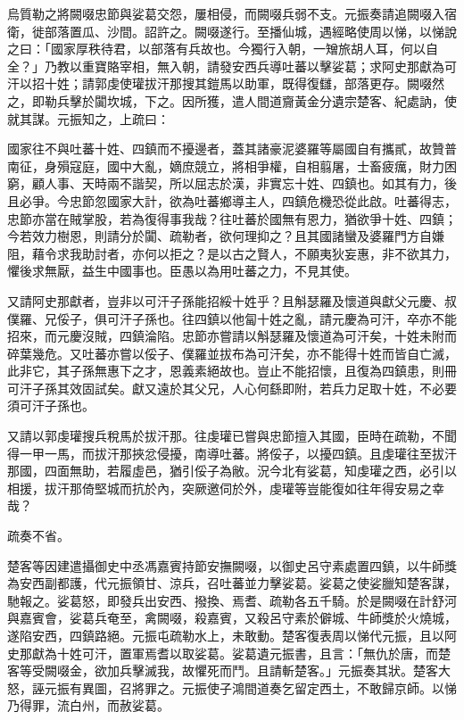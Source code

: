 \begin{pinyinscope}
 烏質勒之將闕啜忠節與娑葛交怨，屢相侵，而闕啜兵弱不支。元振奏請追闕啜入宿衛，徙部落置瓜、沙間。詔許之。闕啜遂行。至播仙城，遇經略使周以悌，以悌說之曰：「國家厚秩待君，以部落有兵故也。今獨行入朝，一矰旅胡人耳，何以自全？」乃教以重寶賂宰相，無入朝，請發安西兵導吐蕃以擊娑葛；求阿史那獻為可汗以招十姓；請郭虔使瓘拔汗那搜其鎧馬以助軍，既得復讎，部落更存。闕啜然之，即勒兵擊於闐坎城，下之。因所獲，遣人間道齎黃金分遺宗楚客、紀處訥，使就其謀。元振知之，上疏曰：



 國家往不與吐蕃十姓、四鎮而不擾邊者，蓋其諸豪泥婆羅等屬國自有攜貳，故贊普南征，身殞寇庭，國中大亂，嫡庶競立，將相爭權，自相翦屠，士畜疲癘，財力困窮，顧人事、天時兩不諧契，所以屈志於漢，非實忘十姓、四鎮也。如其有力，後且必爭。今忠節忽國家大計，欲為吐蕃鄉導主人，四鎮危機恐從此啟。吐蕃得志，忠節亦當在賊掌股，若為復得事我哉？往吐蕃於國無有恩力，猶欲爭十姓、四鎮；今若效力樹恩，則請分於闐、疏勒者，欲何理抑之？且其國諸蠻及婆羅門方自嫌阻，藉令求我助討者，亦何以拒之？是以古之賢人，不願夷狄妄惠，非不欲其力，懼後求無厭，益生中國事也。臣愚以為用吐蕃之力，不見其使。



 又請阿史那獻者，豈非以可汗子孫能招綏十姓乎？且斛瑟羅及懷道與獻父元慶、叔僕羅、兄俀子，俱可汗子孫也。往四鎮以他匐十姓之亂，請元慶為可汗，卒亦不能招來，而元慶沒賊，四鎮淪陷。忠節亦嘗請以斛瑟羅及懷道為可汗矣，十姓未附而碎葉幾危。又吐蕃亦嘗以俀子、僕羅並拔布為可汗矣，亦不能得十姓而皆自亡滅，此非它，其子孫無惠下之才，恩義素絕故也。豈止不能招懷，且復為四鎮患，則冊可汗子孫其效固試矣。獻又遠於其父兄，人心何繇即附，若兵力足取十姓，不必要須可汗子孫也。



 又請以郭虔瓘搜兵稅馬於拔汗那。往虔瓘已嘗與忠節擅入其國，臣時在疏勒，不聞得一甲一馬，而拔汗那挾忿侵擾，南導吐蕃。將俀子，以擾四鎮。且虔瓘往至拔汗那國，四面無助，若履虛邑，猶引俀子為敝。況今北有娑葛，知虔瓘之西，必引以相援，拔汗那倚堅城而抗於內，突厥邀伺於外，虔瓘等豈能復如往年得安易之幸哉？



 疏奏不省。



 楚客等因建遣攝御史中丞馮嘉賓持節安撫闕啜，以御史呂守素處置四鎮，以牛師獎為安西副都護，代元振領甘、涼兵，召吐蕃並力擊娑葛。娑葛之使娑臘知楚客謀，馳報之。娑葛怒，即發兵出安西、撥換、焉耆、疏勒各五千騎。於是闕啜在計舒河與嘉賓會，娑葛兵奄至，禽闕啜，殺嘉賓，又殺呂守素於僻城、牛師獎於火燒城，遂陷安西，四鎮路絕。元振屯疏勒水上，未敢動。楚客復表周以悌代元振，且以阿史那獻為十姓可汗，置軍焉耆以取娑葛。娑葛遺元振書，且言：「無仇於唐，而楚客等受闕啜金，欲加兵擊滅我，故懼死而鬥。且請斬楚客。」元振奏其狀。楚客大怒，誣元振有異圖，召將罪之。元振使子鴻間道奏乞留定西土，不敢歸京師。以悌乃得罪，流白州，而赦娑葛。




\end{pinyinscope}
